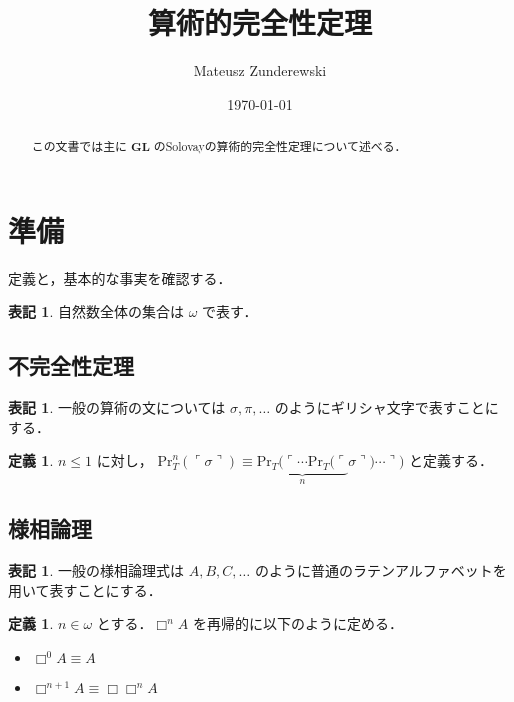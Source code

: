 \documentclass{jsarticle}
\title{算術的完全性定理}
\author{Mateusz Zunderewski}
\date{\today}
\newcommand*{\Logic}[1]{\mathbf{#1}}
\newcommand*{\LogicGL}{\Logic{GL}}
\newcommand*{\Provable}{\mathrm{Pr}}
\theoremstyle{definition}
\newtheorem{definition}[theorem]{定義}
\newtheorem{notation}[theorem]{表記}
\begin{document}
\maketitle

\begin{abstract}
    この文書では主に $\LogicGL$ のSolovayの算術的完全性定理について述べる．
\end{abstract}

\section{準備}

定義と，基本的な事実を確認する．

\begin{notation}
    自然数全体の集合は $\omega$ で表す．
\end{notation}

\subsection{不完全性定理}

\begin{notation}
    一般の算術の文については $\sigma, \pi, \dots$ のようにギリシャ文字で表すことにする．
\end{notation}

\begin{definition}
    $n \leq 1$ に対し，
    $\Provable_T^n(\ulcorner \sigma \urcorner) \equiv \underbrace{\Provable_T(\ulcorner \cdots \Provable_T(\ulcorner}_{n} \sigma \urcorner) \cdots \urcorner)$ と定義する．
\end{definition}


\subsection{様相論理}

\begin{notation}
    一般の様相論理式は $A,B,C,\dots$ のように普通のラテンアルファベットを用いて表すことにする．
\end{notation}

\begin{definition}
    $n \in \omega$ とする．$\Box^n A$ を再帰的に以下のように定める．
    \begin{itemize}
        \item $\Box^0 A \equiv A$
        \item $\Box^{n+1} A \equiv \Box \Box^n A$
    \end{itemize}
\end{definition}
\end{document}
